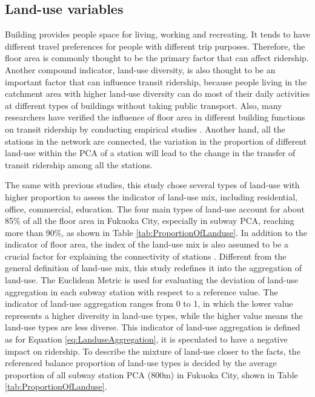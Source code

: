 \documentclass[utf8]{article}
\begin{document}
\subsection{Land-use variables}
\indent

Building provides people space for living, working and recreating. It tends to have different travel preferences for people with different trip purposes. Therefore, the floor area is commonly thought to be the primary factor that can affect ridership. Another compound indicator, land-use diversity, is also thought to be an important factor that can influence transit ridership, because people living in the catchment area with higher land-use diversity can do most of their daily activities at different types of buildings without taking public transport. Also, many researchers have verified the influence of floor area in different building functions on transit ridership by conducting empirical studies \cite{sohn2010factors,gutierrez2011transit,chakraborty2013land,jun2015land}. Another hand, all the stations in the network are connected, the variation in the proportion of different land-use within the PCA of a station will lead to the change in the transfer of transit ridership among all the stations.

The same with previous studies, this study chose several types of land-use with higher proportion to assess the indicator of land-use mix, including residential, office, commercial, education. The four main types of land-use account for about 85\% of all the floor area in Fukuoka City, especially in subway PCA, reaching more than 90\%, as shown in Table \ref{tab:ProportionOfLanduse}. In addition to the indicator of floor area, the index of the land-use mix is also assumed to be a crucial factor for explaining the connectivity of stations \cite{badoe2000transportation,cervero2004transit,frank2004obesity}. Different from the general definition of land-use mix, this study redefines it into the aggregation of land-use. The Euclidean Metric is used for evaluating the deviation of land-use aggregation in each subway station with respect to a reference value. The indicator of land-use aggregation ranges from 0 to 1, in which the lower value represents a higher diversity in land-use types, while the higher value means the land-use types are less diverse. This indicator of land-use aggregation is defined as for Equation \ref{eq:LanduseAggregation}, it is speculated to have a negative impact on ridership. To describe the mixture of land-use closer to the facts, the referenced balance proportion of land-use types is decided by the average proportion of all subway station PCA (800m) in Fukuoka City, shown in Table \ref{tab:ProportionOfLanduse}.
\end{document}
